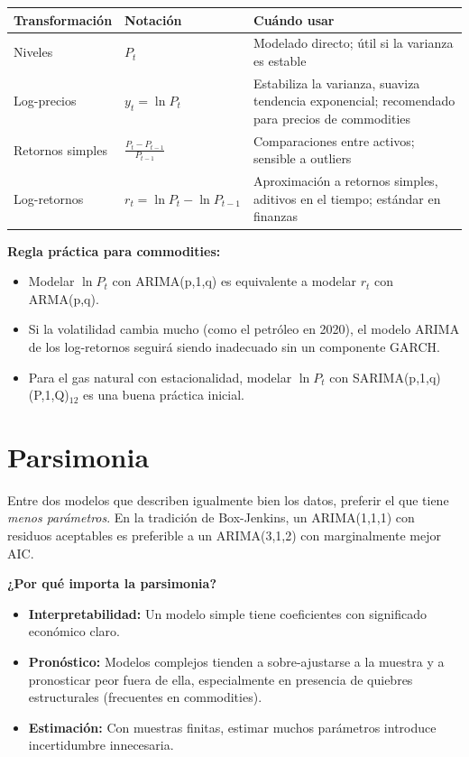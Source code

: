 \documentclass[12pt,a4paper]{article}
\theoremstyle{definition}
\begin{document}
\begin{center}
\renewcommand{\arraystretch}{1.3}
\begin{tabular}{p{2.5cm}p{3.5cm}p{5cm}}
\toprule
\textbf{Transformación} & \textbf{Notación} & \textbf{Cuándo usar} \\
\midrule
Niveles & $P_t$ & Modelado directo; útil si la varianza es estable \\
Log-precios & $y_t = \ln P_t$ & Estabiliza la varianza, suaviza tendencia exponencial; recomendado para precios de commodities \\
Retornos simples & $\frac{P_t - P_{t-1}}{P_{t-1}}$ & Comparaciones entre activos; sensible a outliers \\
Log-retornos & $r_t = \ln P_t - \ln P_{t-1}$ & Aproximación a retornos simples, aditivos en el tiempo; estándar en finanzas \\
\bottomrule
\end{tabular}
\end{center}

\noindent\textbf{Regla práctica para commodities:}
\begin{itemize}[nosep]
  \item Modelar $\ln P_t$ con ARIMA(p,1,q) es equivalente a modelar $r_t$ con ARMA(p,q).
  \item Si la volatilidad cambia mucho (como el petróleo en 2020), el modelo ARIMA
        de los log-retornos seguirá siendo inadecuado sin un componente GARCH.
  \item Para el gas natural con estacionalidad, modelar $\ln P_t$ con SARIMA(p,1,q)(P,1,Q)$_{12}$
        es una buena práctica inicial.
\end{itemize}

\section{Parsimonia}

\begin{defbox}
Entre dos modelos que describen igualmente bien los datos, preferir el que tiene
\emph{menos parámetros}. En la tradición de Box-Jenkins, un ARIMA(1,1,1) con
residuos aceptables es preferible a un ARIMA(3,1,2) con marginalmente mejor AIC.
\end{defbox}

\noindent\textbf{¿Por qué importa la parsimonia?}
\begin{itemize}[nosep]
  \item \textbf{Interpretabilidad:} Un modelo simple tiene coeficientes con
        significado económico claro.
  \item \textbf{Pronóstico:} Modelos complejos tienden a sobre-ajustarse a la
        muestra y a pronosticar peor fuera de ella, especialmente en presencia
        de quiebres estructurales (frecuentes en commodities).
  \item \textbf{Estimación:} Con muestras finitas, estimar muchos parámetros
        introduce incertidumbre innecesaria.
\end{itemize}
\end{document}
